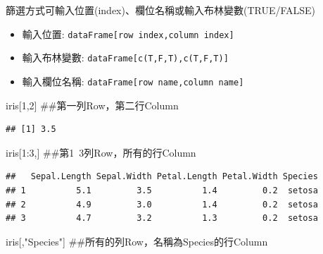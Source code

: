 \documentclass[]{book}
\newenvironment{Shaded}{\begin{snugshade}}{\end{snugshade}}
\newcommand{\DecValTok}[1]{\textcolor[rgb]{0.00,0.00,0.81}{{#1}}}
\newcommand{\StringTok}[1]{\textcolor[rgb]{0.31,0.60,0.02}{{#1}}}
\newcommand{\NormalTok}[1]{{#1}}
\providecommand{\tightlist}{%
  \setlength{\itemsep}{0pt}\setlength{\parskip}{0pt}}
\theoremstyle{definition}
\theoremstyle{definition}
\theoremstyle{remark}
\begin{document}
篩選方式可輸入位置(index)、欄位名稱或輸入布林變數(TRUE/FALSE)

\begin{itemize}
\tightlist
\item
  輸入位置: \texttt{dataFrame{[}row\ index,column\ index{]}}
\item
  輸入布林變數: \texttt{dataFrame{[}c(T,F,T),c(T,F,T){]}}
\item
  輸入欄位名稱: \texttt{dataFrame{[}row\ name,column\ name{]}}
\end{itemize}

\begin{Shaded}
\begin{Highlighting}[]
\NormalTok{iris[}\DecValTok{1}\NormalTok{,}\DecValTok{2}\NormalTok{] ##第一列Row，第二行Column}
\end{Highlighting}
\end{Shaded}

\begin{verbatim}
## [1] 3.5
\end{verbatim}

\begin{Shaded}
\begin{Highlighting}[]
\NormalTok{iris[}\DecValTok{1}\NormalTok{:}\DecValTok{3}\NormalTok{,] ##第1~3列Row，所有的行Column}
\end{Highlighting}
\end{Shaded}

\begin{verbatim}
##   Sepal.Length Sepal.Width Petal.Length Petal.Width Species
## 1          5.1         3.5          1.4         0.2  setosa
## 2          4.9         3.0          1.4         0.2  setosa
## 3          4.7         3.2          1.3         0.2  setosa
\end{verbatim}

\begin{Shaded}
\begin{Highlighting}[]
\NormalTok{iris[,}\StringTok{"Species"}\NormalTok{] ##所有的列Row，名稱為Species的行Column}
\end{Highlighting}
\end{Shaded}
\end{document}
